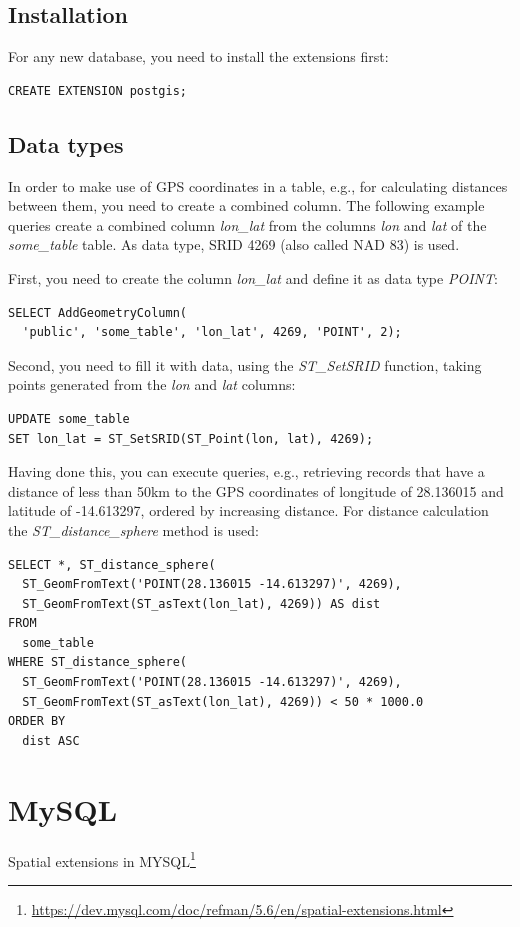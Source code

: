 \documentclass[a4paper]{book}
\begin{document}
\subsection{Installation}
For any new database, you need to install the extensions first:
\begin{verbatim}
CREATE EXTENSION postgis;
\end{verbatim}

\subsection{Data types}
In order to make use of GPS coordinates in a table, e.g., for calculating
distances between them, you need to create a combined column. The following
example queries create a combined column \textit{lon\_lat} from the columns
\textit{lon} and \textit{lat} of the \textit{some\_table} table.
As data type, SRID 4269\cite{srid4269} (also called NAD 83) is used.

\noindent First, you need to create the column \textit{lon\_lat} and
 define it as data type \textit{POINT}:

\begin{verbatim}
SELECT AddGeometryColumn(
  'public', 'some_table', 'lon_lat', 4269, 'POINT', 2);
\end{verbatim}

\noindent Second, you need to fill it with data, using the \textit{ST\_SetSRID}
function, taking points generated from the \textit{lon} and \textit{lat}
columns:
\begin{verbatim}
UPDATE some_table
SET lon_lat = ST_SetSRID(ST_Point(lon, lat), 4269);
\end{verbatim}

\noindent Having done this, you can execute queries, e.g., retrieving records that have
a distance of less than 50km to the GPS coordinates of longitude of 28.136015
and latitude of -14.613297, ordered by increasing distance. For distance
calculation the \textit{ST\_distance\_sphere} method is used:
\begin{verbatim}
SELECT *, ST_distance_sphere(
  ST_GeomFromText('POINT(28.136015 -14.613297)', 4269),
  ST_GeomFromText(ST_asText(lon_lat), 4269)) AS dist
FROM
  some_table
WHERE ST_distance_sphere(
  ST_GeomFromText('POINT(28.136015 -14.613297)', 4269),
  ST_GeomFromText(ST_asText(lon_lat), 4269)) < 50 * 1000.0
ORDER BY
  dist ASC
\end{verbatim}


\section{MySQL}
Spatial extensions in MYSQL\footnote{\url{https://dev.mysql.com/doc/refman/5.6/en/spatial-extensions.html}{}}



\end{document}
